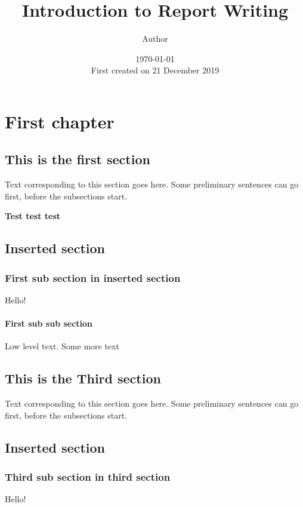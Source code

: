 \documentclass[12pt,a4paper]{report} %
\title{Introduction to Report Writing}
\author{Author}
\date{\today \\ First created on 21 December 2019} %
\begin{document}
\maketitle %


\chapter{First chapter} %

\section{This is the first section}
\Huge Text \normalsize corresponding to this section goes here. Some preliminary sentences can go first, before the subsections start.

\textbf{Test test test} %

\section{Inserted section}	%

\subsection{First sub section in inserted section}
Hello!

\subsubsection{First sub sub section}
Low level text. Some more text

\section{This is the Third section}
\Huge Text \normalsize corresponding to this section goes here. Some preliminary sentences can go first, before the subsections start.

\newpage %

\section{Inserted section}

\subsection{Third sub section in third section}
Hello!
\end{document}
